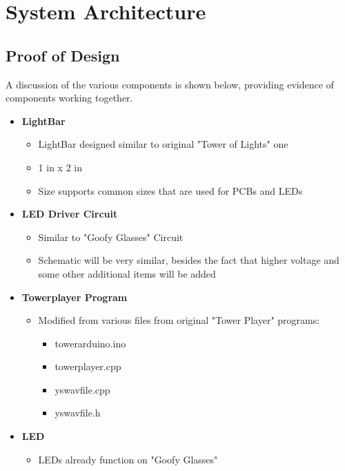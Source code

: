 \documentclass[12pt]{article}
\begin{document}
{{{		\newpage
		
		
	\section{System Architecture}
	
		\subsection{Proof of Design}
		A discussion of the various components is shown below, providing evidence of components working together.
		
		{\renewcommand\labelitemi{}
			\begin{itemize}
				\item \textbf{LightBar}
				\begin{itemize}
					\item LightBar designed similar to original "Tower of Lights" one
					\item 1 in x 2 in
					\item Size supports common sizes that are used for PCBs and LEDs
				\end{itemize}
				\item \textbf{LED Driver Circuit}
				\begin{itemize}
					\item Similar to "Goofy Glasses" Circuit
					\item Schematic will be very similar, besides the fact that higher voltage and some other additional items will be added
				\end{itemize}
				\item \textbf{Towerplayer Program}
				\begin{itemize}
					\item Modified from various files from original "Tower Player" programs:
					\begin{itemize}
						\item towerarduino.ino
						\item towerplayer.cpp
						\item yswavfile.cpp
						\item yswavfile.h
					\end{itemize}
				\end{itemize}
				\item \textbf{LED}
				\begin{itemize}
					\item LEDs already function on "Goofy Glasses"

\end{itemize}
\end{itemize}}}}}
\end{document}
